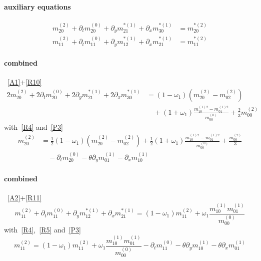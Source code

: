\documentclass{article}
\begin{document}
  \paragraph{auxiliary equations}
  \begin{align}
    m_{20}^{(2)} + \partial_t m_{20}^{(0)} + \partial_y m_{21}^{*(1)} + \partial_x m_{30}^{*(1)} &= m_{20}^{*(2)} \label{A1}\tag{A1} \\
    m_{11}^{(2)} + \partial_t m_{11}^{(0)} + \partial_y m_{12}^{*(1)} + \partial_x m_{21}^{*(1)} &= m_{11}^{*(2)} \label{A2}\tag{A2}
  \end{align}

  \paragraph{combined}~\eqref{A1}$+$\eqref{R10}
  \begin{equation*}
    \begin{aligned}
      2m_{20}^{(2)} + 2\partial_t m_{20}^{(0)} + 2\partial_y m_{21}^{*(1)} + 2\partial_x m_{30}^{*(1)}
      &= (1-\omega_1) (m_{20}^{(2)}-m_{02}^{(2)})
      \\&\quad
      + (1+\omega_1)\frac{ m_{10}^{(1)2} - m_{01}^{(1)2}}{m_{00}^{(0)}} + \frac{2 }{3}m_{00}^{(2)}
    \end{aligned}
  \end{equation*}
  with~\eqref{R4} and~\eqref{P3}
  \begin{equation}
    \label{C1}\tag{C1}
    \begin{aligned}
      m_{20}^{(2)} &= \frac{1}{2}(1-\omega_1) (m_{20}^{(2)}-m_{02}^{(2)})
      + \frac{1}{2}(1+\omega_1)\frac{ m_{10}^{(1)2} - m_{01}^{(1)2}}{m_{00}^{(0)}} + \frac{ m_{00}^{(2)}}{3}
      \\&\quad
      - \partial_t m_{20}^{(0)} - \theta\partial_y m_{01}^{(1)} - \partial_x m_{10}^{(1)}
    \end{aligned}
  \end{equation}
  \paragraph{combined}~\eqref{A2}$+$\eqref{R11}
  \begin{equation*}
    m_{11}^{(2)} + \partial_t m_{11}^{(0)} + \partial_y m_{12}^{*(1)} + \partial_x m_{21}^{*(1)} = (1-\omega_1)m_{11}^{(2)} + \omega_1 \frac{ m_{10}^{(1)}m_{01}^{(1)}}{m_{00}^{(0)}}
  \end{equation*}
  with~\eqref{R4},~\eqref{R5} and~\eqref{P3}
  \begin{equation}
    \label{C2}\tag{C2}
    m_{11}^{(2)} = (1-\omega_1)m_{11}^{(2)} + \omega_1 \frac{ m_{10}^{(1)}m_{01}^{(1)}}{m_{00}^{(0)}}  - \partial_t m_{11}^{(0)} - \theta\partial_y m_{10}^{(1)} - \theta\partial_x m_{01}^{(1)}
  \end{equation}
\end{document}
